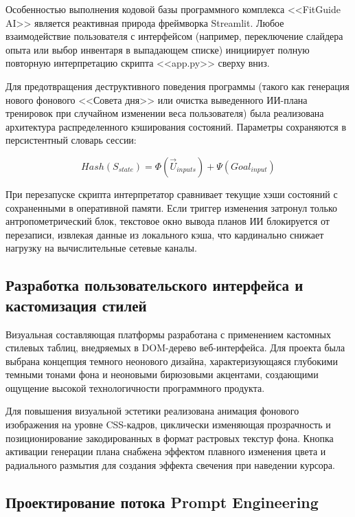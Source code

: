 \documentclass[14pt, a4paper]{extarticle}
\begin{document}
Особенностью выполнения кодовой базы программного комплекса <<FitGuide AI>> является реактивная природа фреймворка Streamlit. Любое взаимодействие пользователя с интерфейсом (например, переключение слайдера опыта или выбор инвентаря в выпадающем списке) инициирует полную повторную интерпретацию скрипта <<app.py>> сверху вниз.

Для предотвращения деструктивного поведения программы (такого как генерация нового фонового <<Совета дня>> или очистка выведенного ИИ-плана тренировок при случайном изменении веса пользователя) была реализована архитектура распределенного кэширования состояний. Параметры сохраняются в персистентный словарь сессии:

\begin{equation}\label{state_hash}
Hash(S_{state}) = \Phi(\vec{U}_{inputs}) + \Psi(Goal_{input})
\end{equation}

При перезапуске скрипта интерпретатор сравнивает текущие хэши состояний с сохраненными в оперативной памяти. Если триггер изменения затронул только антропометрический блок, текстовое окно вывода планов ИИ блокируется от перезаписи, извлекая данные из локального кэша, что кардинально снижает нагрузку на вычислительные сетевые каналы.

\subsection{Разработка пользовательского интерфейса и кастомизация стилей}

Визуальная составляющая платформы разработана с применением кастомных стилевых таблиц, внедряемых в DOM-дерево веб-интерфейса. Для проекта была выбрана концепция темного неонового дизайна, характеризующаяся глубокими темными тонами фона и неоновыми бирюзовыми акцентами, создающими ощущение высокой технологичности программного продукта.

Для повышения визуальной эстетики реализована анимация фонового изображения на уровне CSS-кадров, циклически изменяющая прозрачность и позиционирование закодированных в формат растровых текстур фона. Кнопка активации генерации плана снабжена эффектом плавного изменения цвета и радиального размытия для создания эффекта свечения при наведении курсора.

\subsection{Проектирование потока Prompt Engineering}
\end{document}
